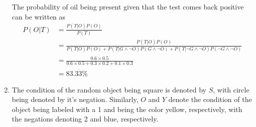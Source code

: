 \documentclass[]{article}
\begin{document}
\begin{enumerate}
The probability of oil being present given that the test comes back positive can be written as
\begin{align}
P(O|T) &= \frac{P(T|O)P(O)}{P(T)}\\
&= \frac{P(T|O)P(O)}{P(T|O)P(O)+P(T|G\land\neg O)P(G\land\neg O) + P(T|\neg G\land\neg O)P(\neg G\land\neg O)}\\
&= \frac{0.6\times 0.5}{0.6\times 0.5 + 0.3\times 0.2 + 0.1\times0.3}\\
&= 83.\overline{33}\%
\end{align}
\item The condition of the random object being square is denoted by $S$, with circle being denoted by it's negation. Similarly, $O$ and $Y$ denote the condition of the object being labeled with a 1 and being the color yellow, respectively, with the negations denoting 2 and blue, respectively. \\


\end{enumerate}
\end{document}
